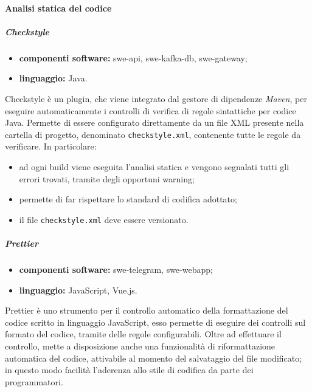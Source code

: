             \paragraph{Analisi statica del codice}

                \subparagraph{Checkstyle}

	                \begin{itemize}
	                    \item \textbf{componenti software:} swe-api, swe-kafka-db, swe-gateway;
	                    \item \textbf{linguaggio:} Java.
	                \end{itemize}
	                
	                Checkstyle è un plugin, che viene integrato dal gestore di dipendenze \textit{Maven}, per eseguire automaticamente i controlli di verifica di regole sintattiche per codice Java.
	                \newline
	                Permette di essere configurato direttamente da un file XML presente nella cartella di progetto, denominato \verb!checkstyle.xml!, contenente tutte le regole da verificare. In particolare:
	                \begin{itemize}
	                    \item ad ogni build viene eseguita l'analisi statica e vengono segnalati tutti gli errori trovati, tramite degli opportuni warning;
	                    \item permette di far rispettare lo standard di codifica adottato;
	                    \item il file \verb!checkstyle.xml! deve essere versionato.
	                \end{itemize}

                \subparagraph{Prettier}

	                \begin{itemize}
	                    \item \textbf{componenti software:} swe-telegram, swe-webapp;
	                    \item \textbf{linguaggio:} JavaScript, Vue.js.
	                \end{itemize}
	                
	                Prettier è uno strumento per il controllo automatico della formattazione del codice scritto in linguaggio JavaScript, esso permette di eseguire dei controlli sul formato del codice, tramite delle regole configurabili.
	                \newline
	                Oltre ad effettuare il controllo, mette a disposizione anche una funzionalità di riformattazione automatica del codice, attivabile al momento del salvataggio del file modificato; in questo modo facilità l'aderenza allo stile di codifica da parte dei programmatori.
				
